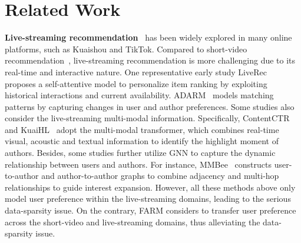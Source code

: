 \section{Related Work}
\textbf{Live-streaming recommendation}~\cite{contentctr,kuaihl,mmbee,moment_cross} has been widely explored in many online platforms, such as Kuaishou and TikTok. 
Compared to short-video recommendation~\cite{m3csr,cvrdd}, live-streaming recommendation is more challenging due to its real-time and interactive nature.
One representative early study LiveRec~\cite{liverec} proposes a self-attentive model to personalize item ranking by exploiting historical interactions and current availability. ADARM~\cite{adarm} models matching patterns by capturing changes in user and author preferences. 
Some studies also consider the live-streaming multi-modal information. Specifically, ContentCTR~\cite{contentctr} and KuaiHL~\cite{kuaihl} adopt the multi-modal transformer, which combines real-time visual, acoustic and textual information to identify the highlight moment of authors. Besides, some studies further utilize GNN to capture the dynamic relationship between users and authors.  
For instance, MMBee~\cite{mmbee} constructs user-to-author and author-to-author graphs to combine adjacency and multi-hop relationships to guide interest expansion. 
However, all these methods above only model user preference within the live-streaming domains, leading to the serious data-sparsity issue. On the contrary, FARM considers to transfer user preference across the short-video and live-streaming domains, thus alleviating the data-sparsity issue.






